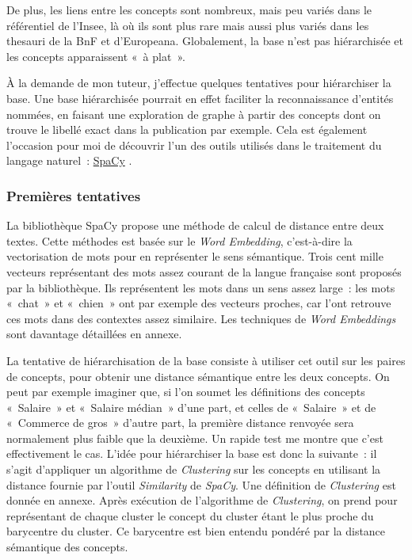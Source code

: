 De plus, les liens entre les concepts sont nombreux, mais peu variés dans le référentiel de l'Insee, là où ils sont plus rare mais aussi plus variés dans les thesauri de la BnF et d'Europeana. Globalement, la base n'est pas hiérarchisée et les concepts apparaissent «~à plat~».
\newline

À la demande de mon tuteur, j'effectue quelques tentatives pour hiérarchiser la base. Une base hiérarchisée pourrait en effet faciliter la reconnaissance d'entités nommées, en faisant une exploration de graphe à partir des concepts dont on trouve le libellé exact dans la publication par exemple. Cela est également l'occasion pour moi de découvrir l'un des outils utilisés dans le traitement du langage naturel~: \href{https://spacy.io/}{SpaCy} \cite{spacy2}.
\label{section 1.2.1}

\subsubsection*{Premières tentatives}
La bibliothèque SpaCy propose une méthode de calcul de distance entre deux textes. Cette méthodes est basée sur le \textit{Word Embedding}, c'est-à-dire la vectorisation de mots pour en représenter le sens sémantique. Trois cent mille vecteurs représentant des mots assez courant de la langue française sont proposés par la bibliothèque. Ils représentent les mots dans un sens assez large~: les mots «~chat~» et «~chien~» ont par exemple des vecteurs proches, car l'ont retrouve ces mots dans des contextes assez similaire. Les techniques de \textit{Word Embeddings} sont davantage détaillées en annexe.
\newline

La tentative de hiérarchisation de la base consiste à utiliser cet outil sur les paires de concepts, pour obtenir une distance sémantique entre les deux concepts. On peut par exemple imaginer que, si l'on soumet les définitions des concepts «~Salaire~» et «~Salaire médian~» d'une part, et celles de «~Salaire~» et de «~Commerce de gros~» d'autre part, la première distance renvoyée sera normalement plus faible que la deuxième. Un rapide test me montre que c'est effectivement le cas. L'idée pour hiérarchiser la base est donc la suivante~: il s'agit d'appliquer un algorithme de \textit{Clustering} sur les concepts en utilisant la distance fournie par l'outil \textit{Similarity} de \textit{SpaCy}. Une définition de \textit{Clustering} est donnée en annexe. Après exécution de l'algorithme de \textit{Clustering}, on prend pour représentant de chaque cluster le concept du cluster étant le plus proche du barycentre du cluster. Ce barycentre est bien entendu pondéré par la distance sémantique des concepts.
\newline

